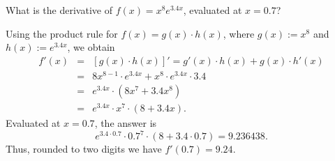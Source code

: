 
\begin{question}
What is the derivative of $f(x) = x^{8} e^{3.4x}$, evaluated at $x = 0.7$?
\end{question}

\begin{solution}
Using the product rule for $f(x) = g(x) \cdot h(x)$, where $g(x) := x^{8}$ and $h(x) := e^{3.4x}$, we obtain
\begin{eqnarray*}
f'(x) & = & [g(x) \cdot h(x)]' = g'(x) \cdot h(x) + g(x) \cdot h'(x) \\
      & = & 8 x^{8 - 1} \cdot e^{3.4x} + x^{8} \cdot e^{3.4x} \cdot 3.4 \\
      & = & e^{3.4x} \cdot(8 x^7 + 3.4 x^{8}) \\
      & = & e^{3.4x} \cdot x^7 \cdot (8 + 3.4x).
\end{eqnarray*}
Evaluated at $x = 0.7$, the answer is
\[ e^{3.4\cdot 0.7} \cdot 0.7^7 \cdot (8 + 3.4\cdot 0.7) = 9.236438. \]
Thus, rounded to two digits we have $f'(0.7) = 9.24$.
\end{solution}


